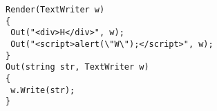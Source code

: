 {\ssp
\begin{lstlisting}[language={[Sharp]C}, caption={Example code where
inline script and regular HTML can be output at the same \dotwrite.},
label=code:reason-for-guards, float] 
Render(TextWriter w)
{
 Out("<div>H</div>", w);
 Out("<script>alert(\"W\");</script>", w);
}
Out(string str, TextWriter w)
{ 
 w.Write(str); 
}
\end{lstlisting}
}

